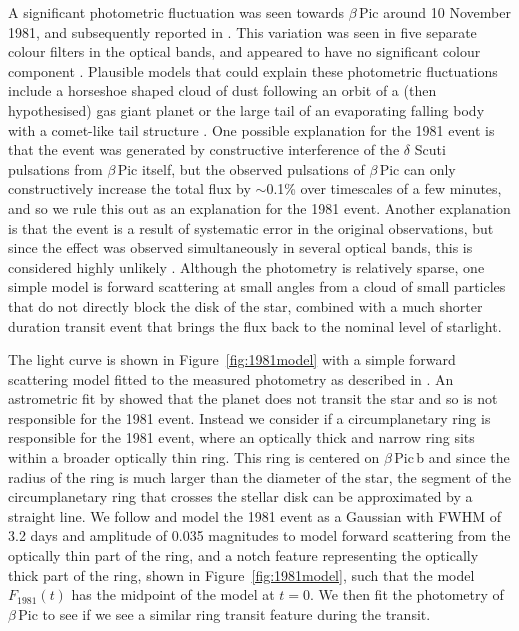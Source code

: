 \documentclass[longauth]{aa} %
\newcommand{\bpb}{$\beta$\,Pic\,b}
\newcommand{\bp}{$\beta$\,Pic}
\begin{document}
A significant photometric fluctuation was seen towards \bp{} around 10 November 1981, and subsequently reported in \citet{LecavelierdesEtangs95}.
%
This variation was seen in five separate colour filters in the optical bands, and appeared to have no significant colour component \citep{Lamers97}.
%
Plausible models that could explain these photometric fluctuations include a horseshoe shaped cloud of dust following an orbit of a (then hypothesised) gas giant planet \citep{LecavelierdesEtangs97} or the large tail of an evaporating falling body with a comet-like tail structure \citep{Lamers97}.
%
One possible explanation for the 1981 event is that the event was generated by constructive interference of the $\delta$ Scuti pulsations from \bp{} itself, but the observed pulsations of \bp{} can only constructively increase the total flux by $\sim$0.1\% over timescales of a few minutes, and so we rule this out as an explanation for the 1981 event.
%
Another explanation is that the event is a result of systematic error in the original observations, but since the effect was observed simultaneously in several optical bands, this is considered highly unlikely \citet{LecavelierdesEtangs95}. 
%
Although the photometry is relatively sparse, one simple model is forward scattering at small angles from a cloud of small particles that do not directly block the disk of the star, combined with a much shorter duration transit event that brings the flux back to the nominal level of starlight.

The light curve is shown in Figure~\ref{fig:1981model} with a simple forward scattering model fitted to the measured photometry as described in \citet{Lamers97}.
%
An astrometric fit by \citet{Wang16} showed that the planet does not transit the star and so is not responsible for the 1981 event.
%
Instead we consider if a circumplanetary ring is responsible for the 1981 event, where an optically thick and narrow ring sits within a broader optically thin ring.
%
This ring is centered on \bpb{} and since the radius of the ring is much larger than the diameter of the star, the segment of the circumplanetary ring that crosses the stellar disk can be approximated by a straight line.
%
We follow \citet{Lamers97} and model the 1981 event as a Gaussian with FWHM of 3.2 days and amplitude of 0.035 magnitudes to model forward scattering from the optically thin part of the ring, and a notch feature representing the optically thick part of the ring, shown in Figure~\ref{fig:1981model}, such that the model $F_{1981}(t)$ has the midpoint of the model at $t=0$.
%
We then fit the photometry of \bp{} to see if we see a similar ring transit feature during the transit.
\end{document}
